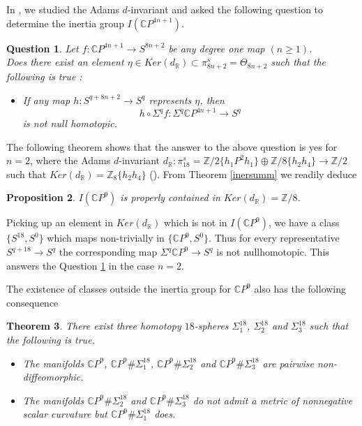 \documentclass[a4paper,leqno,12pt]{amsart}
\theoremstyle{plain}
\newtheorem{theorem}{Theorem}[section]
\newtheorem{prop}[theorem]{Proposition}
\newtheorem{question}[theorem]{Question}
\theoremstyle{definition}
\numberwithin{equation}{section}
\begin{document}
 In \cite{Ram14}, we studied the Adams $d$-invariant and asked the following question to determine the inertia group $I(\mathbb{C} P^{4n+1})$.
\begin{question}\label{raquestion}
 Let $f:\mathbb{C} P^{4n+1}\to S^{8n+2}$ be any degree one map $(n\geq 1)$.\\
 Does there exist an element $\eta\in {\mathit{Ker}}(d_{\mathbb{R}})\subset \pi^s_{8n+2}=\Theta_{8n+2}$ such that the following is true :
 \begin{itemize}
\item [$(\star)$] If any map $h:S^{q+8n+2}\to S^{q}$ represents $\eta$, then $$h\circ \Sigma^{q}f : \Sigma^{q}\mathbb{C} P^{4n+1}\to S^{q}$$ is not null homotopic.
 \end{itemize}
\end{question}
The following theorem shows that the answer to the above question is yes for $n=2$, where the Adams $d$-invariant $d_{\mathbb{R}} : \pi_{18}^{s}={\mathbb{Z}}/2\{h_1P^2h_1\} \oplus {\mathbb{Z}}/8\{h_2h_4\}\to \mathbb{Z}/2$ such that ${\mathit{Ker}}(d_{\mathbb{R}})={\mathbb{Z}}_8\{h_2h_4\}$ (\cite{Ada}). From Theorem \ref{inersumm} we readily deduce
\begin{prop}
$I(\mathbb{C} P^{9})$ is properly contained in ${\mathit{Ker}}(d_{\mathbb{R}})=\mathbb{Z}/8$.
\end{prop}

Picking up an element in ${\mathit{Ker}}(d_{\mathbb{R}})$ which is not in $I({\mathbb{C}} P^9)$, we have a class $\{S^{18},S^0\}$ which maps non-trivially in $\{ {\mathbb{C}} P^9, S^0\}$. Thus for every representative $S^{q+18}\to S^q$ the corresponding map $\Sigma^q {\mathbb{C}} P^9 \to S^q$ is not nullhomotopic. This answers the Question \ref{raquestion} in the case $n=2$. 

The existence of classes outside the inertia group for ${\mathbb{C}} P^9$ also has the following consequence
\begin{theorem}\label{exocom}
There exist three homotopy $18$-spheres $\Sigma^{18}_1$, $\Sigma^{18}_2$ and $\Sigma^{18}_3$ such that the following is true.
\begin{itemize}
\item[\rm{(i)}] The manifolds $\mathbb{C}P^{9}$, $\mathbb{C}P^{9}\#\Sigma^{18}_1$, $\mathbb{C} P^{9}\#\Sigma^{18}_2$ and $\mathbb{C}P^{9}\#\Sigma^{18}_3$ are pairwise non-diffeomorphic.
\item[\rm{(ii)}] The manifolds $\mathbb{C}P^{9}\#\Sigma^{18}_2$ and $\mathbb{C} P^{9}\#\Sigma^{18}_3$ do not admit a metric of nonnegative scalar curvature but $\mathbb{C} P^{9}\#\Sigma^{18}_1$ does.
\end{itemize}
\end{theorem}
\end{document}
